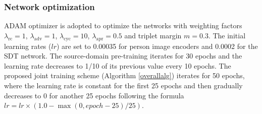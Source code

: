 \documentclass[journal]{IEEEtran}
\begin{document}
\subsubsection{\textbf{Network optimization}}
ADAM optimizer is adopted to optimize the networks with weighting factors $\lambda_\text{rc}=1$, $\lambda_\text{adv}=1$, $\lambda_\text{cyc}=10$, $\lambda_\text{apr}=0.5$ and triplet margin $m=0.3$.
The initial learning rates ($lr$) are set to 0.00035 for person image encoders and 0.0002 for the SDT network.
The source-domain pre-training iterates for 30 epochs and the learning rate decreases to 1/10 of its previous value every 10 epochs.
The proposed joint training scheme (Algorithm \ref{overallalg}) iterates for 50 epochs,
where the learning rate is constant for the first 25 epochs and then gradually decreases to 0 for another 25 epochs following the formula $lr=lr\times(1.0-\max(0,epoch-25)/25)$.
\end{document}
